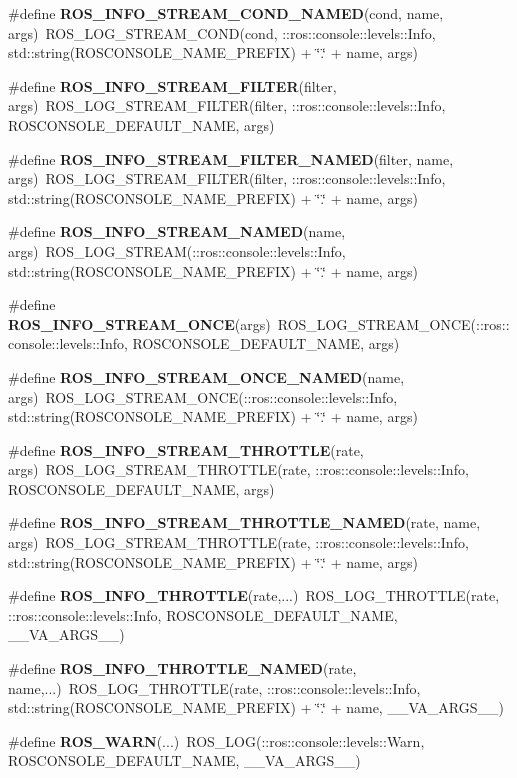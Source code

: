 \begin{DoxyCompactItemize}
\item 
\#define {\bf ROS\_\-INFO\_\-STREAM\_\-COND\_\-NAMED}(cond, name, args)~ROS\_\-LOG\_\-STREAM\_\-COND(cond, ::ros::console::levels::Info, std::string(ROSCONSOLE\_\-NAME\_\-PREFIX) + \char`\"{}.\char`\"{} + name, args)
\item 
\#define {\bf ROS\_\-INFO\_\-STREAM\_\-FILTER}(filter, args)~ROS\_\-LOG\_\-STREAM\_\-FILTER(filter, ::ros::console::levels::Info, ROSCONSOLE\_\-DEFAULT\_\-NAME, args)
\item 
\#define {\bf ROS\_\-INFO\_\-STREAM\_\-FILTER\_\-NAMED}(filter, name, args)~ROS\_\-LOG\_\-STREAM\_\-FILTER(filter, ::ros::console::levels::Info, std::string(ROSCONSOLE\_\-NAME\_\-PREFIX) + \char`\"{}.\char`\"{} + name, args)
\item 
\#define {\bf ROS\_\-INFO\_\-STREAM\_\-NAMED}(name, args)~ROS\_\-LOG\_\-STREAM(::ros::console::levels::Info, std::string(ROSCONSOLE\_\-NAME\_\-PREFIX) + \char`\"{}.\char`\"{} + name, args)
\item 
\#define {\bf ROS\_\-INFO\_\-STREAM\_\-ONCE}(args)~ROS\_\-LOG\_\-STREAM\_\-ONCE(::ros::console::levels::Info, ROSCONSOLE\_\-DEFAULT\_\-NAME, args)
\item 
\#define {\bf ROS\_\-INFO\_\-STREAM\_\-ONCE\_\-NAMED}(name, args)~ROS\_\-LOG\_\-STREAM\_\-ONCE(::ros::console::levels::Info, std::string(ROSCONSOLE\_\-NAME\_\-PREFIX) + \char`\"{}.\char`\"{} + name, args)
\item 
\#define {\bf ROS\_\-INFO\_\-STREAM\_\-THROTTLE}(rate, args)~ROS\_\-LOG\_\-STREAM\_\-THROTTLE(rate, ::ros::console::levels::Info, ROSCONSOLE\_\-DEFAULT\_\-NAME, args)
\item 
\#define {\bf ROS\_\-INFO\_\-STREAM\_\-THROTTLE\_\-NAMED}(rate, name, args)~ROS\_\-LOG\_\-STREAM\_\-THROTTLE(rate, ::ros::console::levels::Info, std::string(ROSCONSOLE\_\-NAME\_\-PREFIX) + \char`\"{}.\char`\"{} + name, args)
\item 
\#define {\bf ROS\_\-INFO\_\-THROTTLE}(rate,...)~ROS\_\-LOG\_\-THROTTLE(rate, ::ros::console::levels::Info, ROSCONSOLE\_\-DEFAULT\_\-NAME, \_\-\_\-VA\_\-ARGS\_\-\_\-)
\item 
\#define {\bf ROS\_\-INFO\_\-THROTTLE\_\-NAMED}(rate, name,...)~ROS\_\-LOG\_\-THROTTLE(rate, ::ros::console::levels::Info, std::string(ROSCONSOLE\_\-NAME\_\-PREFIX) + \char`\"{}.\char`\"{} + name, \_\-\_\-VA\_\-ARGS\_\-\_\-)
\item 
\#define {\bf ROS\_\-WARN}(...)~ROS\_\-LOG(::ros::console::levels::Warn, ROSCONSOLE\_\-DEFAULT\_\-NAME, \_\-\_\-VA\_\-ARGS\_\-\_\-)
\item 

\end{DoxyCompactItemize}
